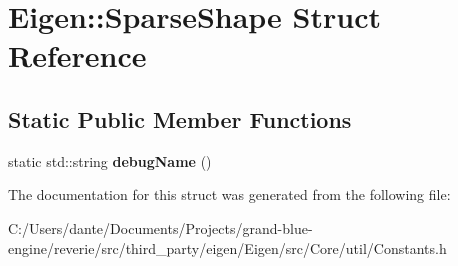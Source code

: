 \hypertarget{struct_eigen_1_1_sparse_shape}{}\section{Eigen\+::Sparse\+Shape Struct Reference}
\label{struct_eigen_1_1_sparse_shape}
\subsection*{Static Public Member Functions}
\begin{DoxyCompactItemize}
\item 
\mbox{\label{struct_eigen_1_1_sparse_shape_a0a0b77bfa8e396b828d3268abaaadfd9}} 
static std\+::string {\bfseries debug\+Name} ()
\end{DoxyCompactItemize}


The documentation for this struct was generated from the following file\+:\begin{DoxyCompactItemize}
\item 
C\+:/\+Users/dante/\+Documents/\+Projects/grand-\/blue-\/engine/reverie/src/third\+\_\+party/eigen/\+Eigen/src/\+Core/util/Constants.\+h\end{DoxyCompactItemize}
